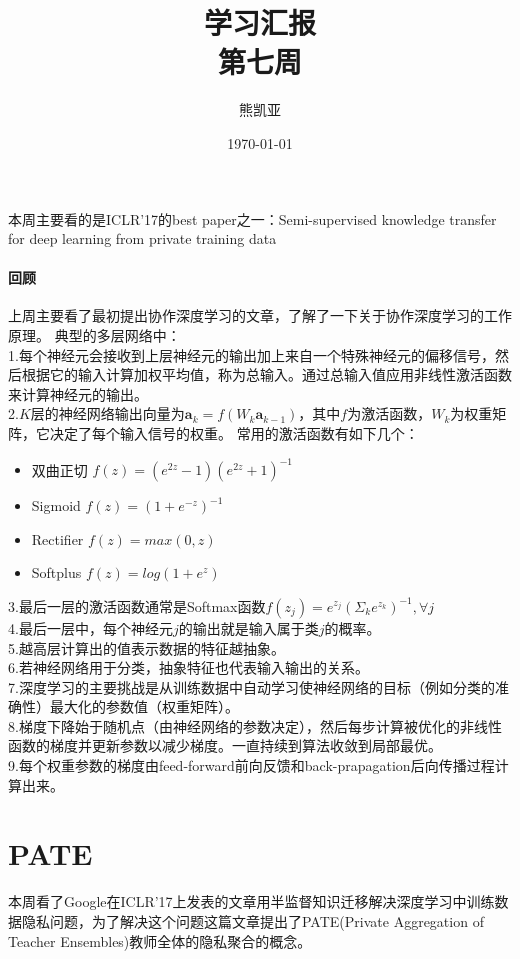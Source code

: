 \documentclass[a4paper]{article}
\title{学习汇报\\第七周}
\author{熊凯亚}
\date{\today}
\begin{document}
\maketitle

本周主要看的是ICLR'17的best paper之一：Semi-supervised knowledge transfer for deep learning from private training data
\paragraph{回顾}

上周主要看了最初提出协作深度学习的文章\cite{shokri2015privacy}，了解了一下关于协作深度学习的工作原理。
典型的多层网络中：\\
1.每个神经元会接收到上层神经元的输出加上来自一个特殊神经元的偏移信号，然后根据它的输入计算加权平均值，称为总输入。通过总输入值应用非线性激活函数来计算神经元的输出。\\
2.$K$层的神经网络输出向量为$\bm{a}_k=f(W_k\bm{a}_{k-1})$，其中$f$为激活函数，$W_k$为权重矩阵，它决定了每个输入信号的权重。
常用的激活函数有如下几个：
\begin{itemize}
\item 双曲正切 $f(z)=(e^{2z}-1)(e^{2z}+1)^{-1}$
\item Sigmoid $f(z)=(1+e^{-z})^{-1}$
\item Rectifier $f(z)=max(0,z)$
\item Softplus $f(z)=log(1+e^z)$
\end{itemize}
3.最后一层的激活函数通常是Softmax函数$f(z_j)=e^{z_j}(\Sigma_ke^{z_k})^{-1},\forall j$ \\
4.最后一层中，每个神经元$j$的输出就是输入属于类$j$的概率。\\
5.越高层计算出的值表示数据的特征越抽象。\\
6.若神经网络用于分类，抽象特征也代表输入输出的关系。\\
7.深度学习的主要挑战是从训练数据中自动学习使神经网络的目标（例如分类的准确性）最大化的参数值（权重矩阵）。\\
8.梯度下降始于随机点（由神经网络的参数决定），然后每步计算被优化的非线性函数的梯度并更新参数以减少梯度。一直持续到算法收敛到局部最优。\\
9.每个权重参数的梯度由feed-forward前向反馈和back-prapagation后向传播过程计算出来。

\section{PATE}

本周看了Google在ICLR'17上发表的文章\cite{Papernot2016SemisupervisedKT}用半监督知识迁移解决深度学习中训练数据隐私问题，为了解决这个问题这篇文章提出了PATE(Private Aggregation of Teacher Ensembles)教师全体的隐私聚合的概念。
\end{document}
